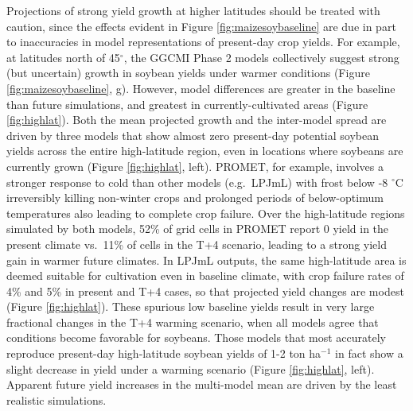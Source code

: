 \documentclass[gmd, manuscript]{copernicus} %
\begin{document}
Projections of strong yield growth at higher latitudes should be treated with caution, since the effects evident in Figure \ref{fig:maizesoybaseline} are due in part to inaccuracies in model representations of present-day crop yields. 
For example, at latitudes north of 45$^\circ$, the GGCMI Phase 2 models collectively suggest strong (but uncertain) growth in soybean yields under warmer conditions (Figure \ref{fig:maizesoybaseline}, g). 
However, model differences are greater in the baseline than future simulations, and greatest in currently-cultivated areas (Figure \ref{fig:highlat}). 
Both the mean projected growth and the inter-model spread are driven by three models that show almost zero present-day potential soybean yields across the entire high-latitude region, even in locations where soybeans are currently grown (Figure \ref{fig:highlat}, left).
PROMET, for example, involves a stronger response to cold than other models (e.g.\ LPJmL) with frost below -8 $^\circ$C irreversibly killing non-winter crops and prolonged periods of below-optimum temperatures also leading to complete crop failure. 
Over the high-latitude regions simulated by both models, 52\% of grid cells in PROMET report 0 yield in the present climate vs.\ 
11\% of cells in the T+4 scenario, leading to a strong yield gain in warmer future climates. 
In LPJmL outputs, the same high-latitude area is deemed suitable for cultivation even in baseline climate, with crop failure rates of 4\% and 5\% in present and T+4 cases, so that projected yield changes are modest (Figure \ref{fig:highlat}).
These spurious low baseline yields result in very large fractional changes in the T+4 warming scenario, when all models agree that conditions become favorable for soybeans. 
Those models that most accurately reproduce present-day high-latitude soybean yields of 1-2 ton ha$^{-1}$ \citep{Ray2012} in fact show a slight decrease in yield under a warming scenario (Figure \ref{fig:highlat}, left). 
Apparent future yield increases in the multi-model mean are driven by the least realistic simulations.
\end{document}
